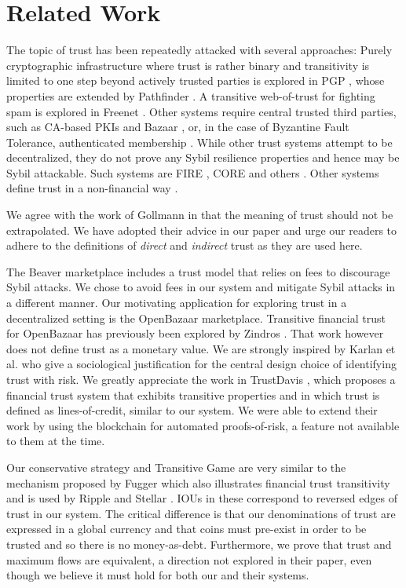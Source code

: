 \section{Related Work}
  The topic of trust has been repeatedly attacked with several approaches: Purely cryptographic infrastructure where trust
  is rather binary and transitivity is limited to one step beyond actively trusted parties is explored in PGP \cite{pgp},
  whose properties are extended by Pathfinder \cite{pathfinder}. A
  transitive web-of-trust for fighting spam is explored in Freenet \cite{freenet}. Other systems require central trusted
  third parties, such as CA-based PKIs \cite{pki} and Bazaar \cite{bazaar}, or, in the case of Byzantine Fault Tolerance,
  authenticated membership \cite{byzantine}. While other trust systems attempt to be decentralized, they do not prove any
  Sybil resilience properties and hence may be Sybil attackable. Such systems are FIRE \cite{fire}, CORE \cite{core} and
  others \cite{openrep,ghkkw,rk}. Other systems define trust in a non-financial way
  \cite{mui,beta,pace,vpc,sdt,wot,pathfinder}.

  We agree with the work of Gollmann \cite{badtrust} in that the meaning of trust should not be extrapolated. We have adopted
  their advice in our paper and urge our readers to adhere to the definitions of \textit{direct} and \textit{indirect} trust
  as they are used here.

  The Beaver marketplace \cite{beaver} includes a trust model that relies on fees to discourage Sybil attacks. We chose to
  avoid fees in our system and mitigate Sybil attacks in a different manner. Our motivating application for exploring trust
  in a decentralized setting is the OpenBazaar marketplace. Transitive financial trust for OpenBazaar has previously been
  explored by Zindros \cite{dionyziz}. That work however does not define trust as a monetary value. We are strongly inspired
  by Karlan et al. \cite{kmrs} who give a sociological justification for the central design choice of identifying trust with
  risk. We greatly appreciate the work in TrustDavis \cite{davis}, which proposes a financial trust system that exhibits
  transitive properties and in which trust is defined as lines-of-credit, similar to our system. We were able to extend their
  work by using the blockchain for automated proofs-of-risk, a feature not available to them at the time.

  Our conservative strategy and Transitive Game are very similar to the mechanism proposed by Fugger \cite{iou} which also
  illustrates financial trust transitivity and is used by Ripple \cite{ripple} and Stellar \cite{stellar}. IOUs in these
  correspond to reversed edges of trust in our system. The critical difference is that our denominations of trust are
  expressed in a global currency and that coins must pre-exist in order to be trusted and so there is no money-as-debt.
  Furthermore, we prove that trust and maximum flows are equivalent, a direction not explored in their paper, even though we
  believe it must hold for both our and their systems.
